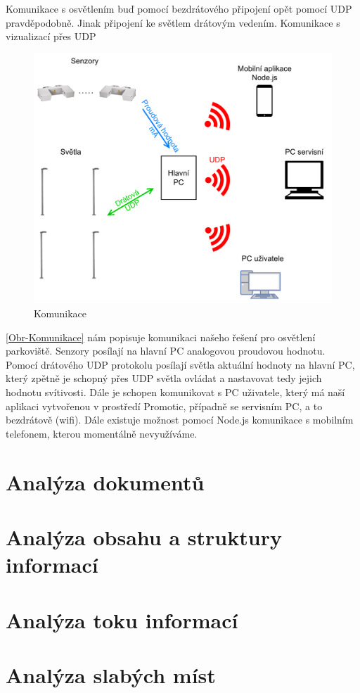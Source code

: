 Komunikace s osvětlením buď pomocí bezdrátového připojení opět pomocí UDP pravděpodobně.
Jinak připojení ke světlem drátovým vedením.
Komunikace s vizualizací přes UDP

\begin{figure}[H]
    \centering\includegraphics[width=.8\textwidth]{Figures/udp.drawio.pdf}   
    \caption{Komunikace}
    \label{Obr-Komunikace}
\end{figure}

\autoref{Obr-Komunikace} nám popisuje komunikaci našeho řešení pro osvětlení parkoviště. Senzory posílají na hlavní PC analogovou proudovou hodnotu. Pomocí drátového UDP protokolu posílají světla aktuální hodnoty na hlavní PC, který zpětně je schopný přes UDP světla ovládat a nastavovat tedy jejich hodnotu svítivosti. Dále je schopen komunikovat s PC uživatele, který má naší aplikaci vytvořenou v prostředí Promotic, případně se servisním PC, a to bezdrátově (wifi). Dále existuje možnost pomocí Node.js komunikace s mobilním telefonem, kterou momentálně nevyužíváme.



\section{Analýza dokumentů}

\section{Analýza obsahu a struktury informací}

\section{Analýza toku informací}

\section{Analýza slabých míst}


\endinput
